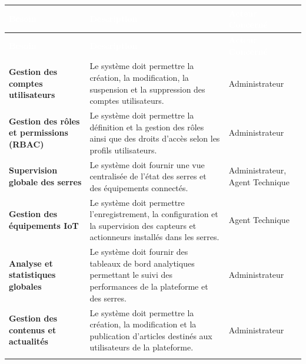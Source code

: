 {\small
	\renewcommand{\arraystretch}{1.5}
	\begin{longtable}{|>{\raggedright\arraybackslash}p{4cm}|>{\raggedright\arraybackslash}p{9cm}|>{\raggedright\arraybackslash}p{3cm}|}
		
		\hline
		\rowcolor[HTML]{2C3E50}
		\textcolor{white}{\textbf{Besoin}} &
		\textcolor{white}{\textbf{Description}} &
		\textcolor{white}{\textbf{Acteur Concerné}}
		\\ \hline
		\endfirsthead
		
		\hline
		\rowcolor[HTML]{2C3E50}
		\textcolor{white}{\textbf{Besoin}} &
		\textcolor{white}{\textbf{Description}} &
		\textcolor{white}{\textbf{Acteur Concerné}}
		\\ \hline
		\endhead
		
		\rowcolor[HTML]{EFEFEF}
		\textbf{Gestion des comptes utilisateurs} &
		Le système doit permettre la création, la modification, la suspension et la suppression des comptes utilisateurs. &
		Administrateur
		\\ \hline
		
		\textbf{Gestion des rôles et permissions (RBAC)} &
		Le système doit permettre la définition et la gestion des rôles ainsi que des droits d’accès selon les profils utilisateurs. &
		Administrateur
		\\ \hline
		
		\rowcolor[HTML]{EFEFEF}
		\textbf{Supervision globale des serres} &
		Le système doit fournir une vue centralisée de l’état des serres et des équipements connectés. &
		Administrateur, Agent Technique
		\\ \hline
		
		\textbf{Gestion des équipements IoT} &
		Le système doit permettre l’enregistrement, la configuration et la supervision des capteurs et actionneurs installés dans les serres. &
		Agent Technique
		\\ \hline
		
		\rowcolor[HTML]{EFEFEF}
		\textbf{Analyse et statistiques globales} &
		Le système doit fournir des tableaux de bord analytiques permettant le suivi des performances de la plateforme et des serres. &
		Administrateur
		\\ \hline
		
		\textbf{Gestion des contenus et actualités} &
		Le système doit permettre la création, la modification et la publication d’articles destinés aux utilisateurs de la plateforme. &
		Administrateur
		\\ \hline
		
		\rowcolor[HTML]{EFEFEF}
		

\end{longtable}}
